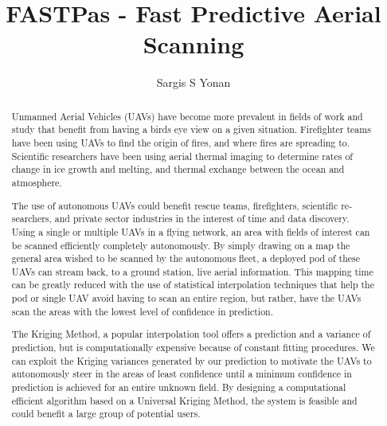 \documentclass[11pt]{ucthesis}
\begin{document}

\title{FASTPas - Fast Predictive Aerial Scanning}
\author{Sargis S Yonan}
\deanlinethree{}

\begin{frontmatter}

\maketitle
\copyrightpage

\tableofcontents
\listoffigures
\listoftables

\begin{abstract}
Unmanned Aerial Vehicles (UAVs) have become more prevalent in fields of work and study that benefit from having a birds eye view on a given situation. Firefighter teams have been using UAVs to find the origin of fires, and where fires are spreading to. Scientific researchers have been using aerial thermal imaging to determine rates of change in ice growth and melting, and thermal exchange between the ocean and atmosphere.
\par
The use of autonomous UAVs could benefit rescue teams, firefighters, scientific re- searchers, and private sector industries in the interest of time and data discovery. Using a single or multiple UAVs in a flying network, an area with fields of interest can be scanned efficiently completely autonomously. By simply drawing on a map the general area wished to be scanned by the autonomous fleet, a deployed pod of these UAVs can stream back, to a ground station, live aerial information. This mapping time can be greatly reduced with the use of statistical interpolation techniques that help the pod or single UAV avoid having to scan an entire region, but rather, have the UAVs scan the areas with the lowest level of confidence in prediction.
\par
The Kriging Method, a popular interpolation tool offers a prediction and a variance of prediction, but is computationally expensive because of constant fitting procedures. We can exploit the Kriging variances generated by our prediction to motivate the UAVs to autonomously steer in the areas of least confidence until a minimum confidence in prediction is achieved for an entire unknown field. By designing a computational efficient algorithm based on a Universal Kriging Method, the system is feasible and could benefit a large group of potential users.
\end{abstract}


\end{frontmatter}
\end{document}
